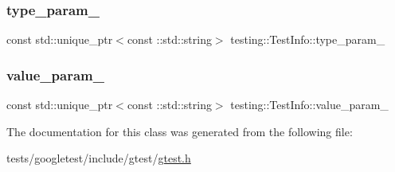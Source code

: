 \subsubsection{\texorpdfstring{type\+\_\+param\+\_\+}{type\_param\_}}
{\footnotesize\ttfamily const std\+::unique\+\_\+ptr$<$const \+::std\+::string$>$ testing\+::\+Test\+Info\+::type\+\_\+param\+\_\+\hspace{0.3cm}{\ttfamily [private]}}

\mbox{\label{classtesting_1_1TestInfo_adf2e7579cf713f7b2df1d542ca2ab9ff}} 
\subsubsection{\texorpdfstring{value\+\_\+param\+\_\+}{value\_param\_}}
{\footnotesize\ttfamily const std\+::unique\+\_\+ptr$<$const \+::std\+::string$>$ testing\+::\+Test\+Info\+::value\+\_\+param\+\_\+\hspace{0.3cm}{\ttfamily [private]}}



The documentation for this class was generated from the following file\+:\begin{DoxyCompactItemize}
\item 
tests/googletest/include/gtest/\hyperlink{gtest_8h}{gtest.\+h}\end{DoxyCompactItemize}
